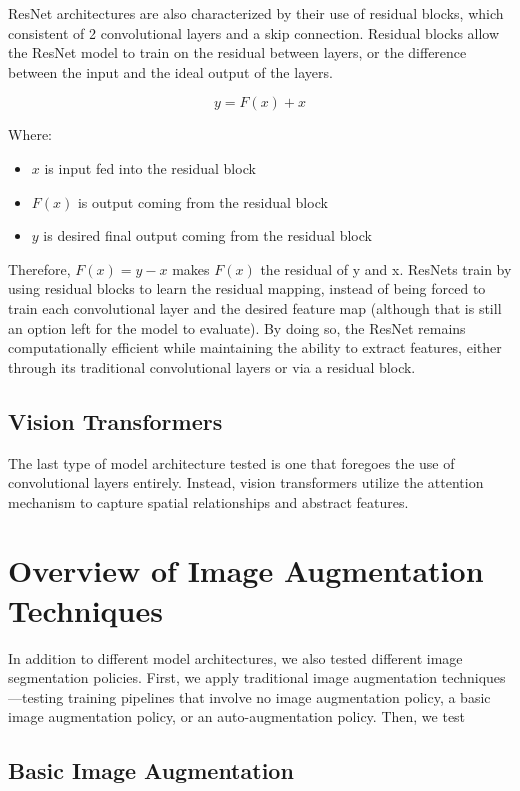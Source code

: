 \documentclass [MS] {uclathes}
\begin{document}
ResNet architectures are also characterized by their use of residual blocks, which consistent of 2 convolutional layers 
and a skip connection. Residual blocks allow the ResNet model to train on the residual between layers, or the difference 
between the input and the ideal output of the layers. 

\[y = F(x) + x\]

Where:
\begin{itemize}
    \item \(x\) is input fed into the residual block
    \item \(F(x)\) is output coming from the residual block
    \item \(y\) is desired final output coming from the residual block
\end{itemize}

Therefore, \(F(x) = y - x\) makes \(F(x)\) the residual of y and x. ResNets train by using residual blocks to learn the 
residual mapping, instead of being forced to train each convolutional layer and the desired feature map (although that 
is still an option left for the model to evaluate). By doing so, the ResNet remains computationally efficient while 
maintaining the ability to extract features, either through its traditional convolutional layers or via a residual 
block. 

\section{Vision Transformers}
The last type of model architecture tested is one that foregoes the use of convolutional layers entirely. Instead, 
vision transformers utilize the attention mechanism to capture spatial relationships and abstract features.

\chapter{Overview of Image Augmentation Techniques}
In addition to different model architectures, we also tested different image segmentation policies. First, we apply 
traditional image augmentation techniques---testing training pipelines that involve no image augmentation policy, a 
basic image augmentation policy, or an auto-augmentation policy. Then, we test 

\section{Basic Image Augmentation}
\end{document}
